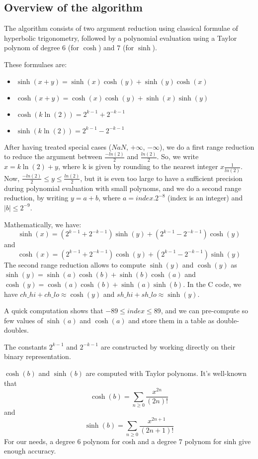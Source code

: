 \subsection{Overview of the algorithm}

The algorithm consists of two argument reduction using classical
formulae of hyperbolic trigonometry, followed by a polynomial
evaluation using a Taylor polynom of degree $6$ (for $\cosh$) and $7$
(for $\sinh$).

These formulaes are:
\begin{itemize}
\item  $\sinh(x + y) = \sinh(x)  \cosh(y) + \sinh(y)  \cosh(x)$
\item  $\cosh(x + y) = \cosh(x)  \cosh(y) + \sinh(x)  \sinh(y)$
\item  $\cosh(k\ln(2)) = 2^{k-1} + 2^{-k-1}$
\item   $\sinh(k\ln(2)) = 2^{k-1} - 2^{-k-1}$
\end{itemize}



After having treated special cases ($NaN$, $+\infty$, $-\infty$), we
do a first range reduction to reduce the argument between
$\frac{-ln(2)}{2}$ and $\frac{ln(2)}{2}$.  So, we write $x = k\ln(2)
+ y$, where k is given by rounding to the nearest integer $x 
\frac{1}{ln(2)}$.  Now, $\frac{-ln(2)}{2} \leq y \leq
\frac{ln(2)}{2}$, but it is even too large to have a sufficient
precision during polynomial evaluation with small polynoms, and we do
a second range reduction, by writing $y = a + b$, where $a = index .
2^{-8}$ (index is an integer) and $|b| \leq 2^{-9}$.

Mathematically, we have: $$\sinh(x) = (2^{k-1} + 2^{-k-1})\sinh(y) +
(2^{k-1} - 2^{-k-1}) \cosh(y)$$
and $$\cosh(x) = (2^{k-1} +
2^{-k-1})\cosh(y) + (2^{k-1} - 2^{-k-1}) \sinh(y)$$
The second range
reduction allows to compute $\sinh(y)$ and $\cosh(y)$ as $\sinh(y) =
\sinh(a) \cosh(b) + \sinh(b) \cosh(a)$ and $\cosh(y) = \cosh(a) 
\cosh(b) + \sinh(a) \sinh(b)$. In the C code, we have $ch\_hi + ch\_lo
\approx \cosh(y)$ and $sh\_hi + sh\_lo \approx \sinh(y)$.

A quick computation shows that $-89 \leq index \leq 89$, and we can
pre-compute so few values of $\sinh(a)$ and $\cosh(a)$ and store them in
a table as double-doubles.


The constants $2^{k-1}$ and $2^{-k-1}$ are constructed by working
directly on their binary representation.


$\cosh(b)$ and $\sinh(b)$ are computed with Taylor polynoms. It's
well-known that $$\cosh(b) = \sum_{n \geq 0}{\frac{x^{2n}}{(2n)!}}$$
and $$\sinh(b) = \sum_{n \geq 0}{\frac{x^{2n+1}}{(2n+1)!}}$$
For our
needs, a degree $6$ polynom for cosh and a degree $7$ polynom for sinh
give enough accuracy.


